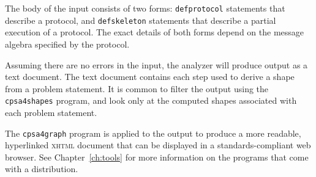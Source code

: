 The body of the input consists of two forms: \texttt{defprotocol}
statements that describe a protocol, and \texttt{defskeleton}
statements that describe a partial execution of a protocol.  The exact
details of both forms depend on the message algebra specified by the
protocol.



Assuming there are no errors in the input, the analyzer
will produce output as a text document.  The text document
contains each step used to derive a shape from a problem statement.
It is common to filter the output using the \texttt{cpsa4shapes}
program, and look only at the computed shapes associated with each
problem statement.

The \texttt{cpsa4graph} program is applied to the output to produce a
more readable, hyperlinked \textsc{xhtml} document that can be displayed
in a standards-compliant web browser.  See Chapter~\ref{ch:tools} for
more information on the programs that come with a {\cpsa} distribution.

%




